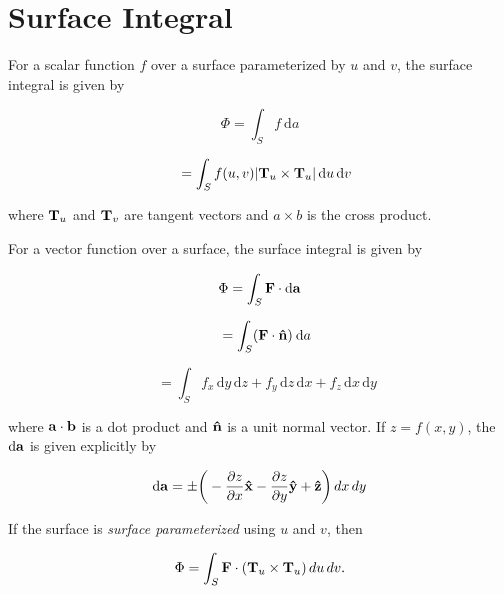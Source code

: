 \documentclass[10pt, letterpaper]{article}
\numberwithin{equation}{section}
\begin{document}
\thispagestyle{empty}
\pagestyle{empty}
\section*{Surface Integral}
\renewcommand\thesection{1}
\hrulefill \newline

\begin{fleqn}
For a scalar function $f$ over a surface parameterized by $u$ and $v$, the surface integral is given by \newline

\begin{equation}
\Phi = \int_S f \: \mathrm{d}a
\end{equation}

\begin{equation}
\:\:\;\; = \int_S f(u,v)|{\bf T}_u \times {\bf T}_u| \, \mathrm{d}u \, \mathrm{d}v
\end{equation} \newline

where ${\bf T}_u$ and ${\bf T}_v$ are tangent vectors and $a \times b$ is the cross product. \newline

For a vector function over a surface, the surface integral is given by \newline

\begin{equation}
\Phi = \int_S {\bf F} \cdot \mathrm{d{\bf a}}
\end{equation}

\begin{equation}
\:\:\;\; = \int_S ({\bf F} \cdot {\bf \hat{n}}) \: \mathrm{d}a
\end{equation}

\begin{equation}
\:\:\;\; = \int_S f_x \, \mathrm{d}y \, \mathrm{d}z + f_y \, \mathrm{d}z \, \mathrm{d}x + f_z \, \mathrm{d}x \, \mathrm{d}y
\end{equation} \newline

where ${\bf a \cdot b}$ is a dot product and ${\bf \hat{n}}$ is a unit normal vector. If $z=f(x, y)$, the $\mathrm{d{\bf a}}$ is given explicitly by \newline

\begin{equation}
\mathrm{d{\bf a}} = \pm \bigg(-\frac{\partial z}{\partial x}{\bf \hat{x}} - \frac{\partial z}{\partial y}{\bf \hat{y}} + {\bf \hat{z}}\bigg) \, dx \, dy
\end{equation} \newline

If the surface is {\it surface parameterized} using $u$ and $v$, then \newline

\begin{equation}
\Phi = \int_S {\bf F} \cdot ({\bf T}_u \times {\bf T}_u) \, du \, dv.
\end{equation}
\end{fleqn} \newpage
\end{document}
